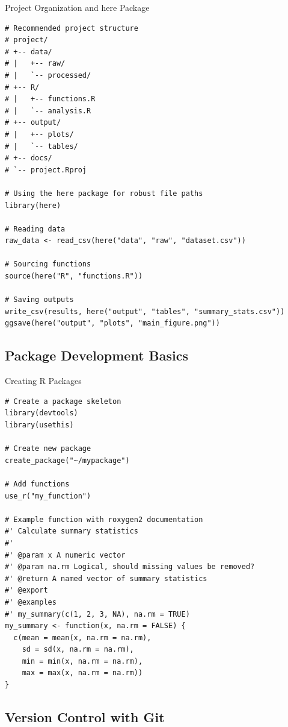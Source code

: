 \documentclass[aspectratio=169]{beamer}
\begin{document}
\begin{frame}[fragile]{Project Organization and here Package}
\begin{lstlisting}
# Recommended project structure
# project/
# +-- data/
# |   +-- raw/
# |   `-- processed/
# +-- R/
# |   +-- functions.R
# |   `-- analysis.R
# +-- output/
# |   +-- plots/
# |   `-- tables/
# +-- docs/
# `-- project.Rproj

# Using the here package for robust file paths
library(here)

# Reading data
raw_data <- read_csv(here("data", "raw", "dataset.csv"))

# Sourcing functions
source(here("R", "functions.R"))

# Saving outputs
write_csv(results, here("output", "tables", "summary_stats.csv"))
ggsave(here("output", "plots", "main_figure.png"))
\end{lstlisting}
\end{frame}

\subsection{Package Development Basics}

\begin{frame}[fragile]{Creating R Packages}
\begin{lstlisting}
# Create a package skeleton
library(devtools)
library(usethis)

# Create new package
create_package("~/mypackage")

# Add functions
use_r("my_function")

# Example function with roxygen2 documentation
#' Calculate summary statistics
#'
#' @param x A numeric vector
#' @param na.rm Logical, should missing values be removed?
#' @return A named vector of summary statistics
#' @export
#' @examples
#' my_summary(c(1, 2, 3, NA), na.rm = TRUE)
my_summary <- function(x, na.rm = FALSE) {
  c(mean = mean(x, na.rm = na.rm),
    sd = sd(x, na.rm = na.rm),
    min = min(x, na.rm = na.rm),
    max = max(x, na.rm = na.rm))
}
\end{lstlisting}
\end{frame}

\subsection{Version Control with Git}
\end{document}
